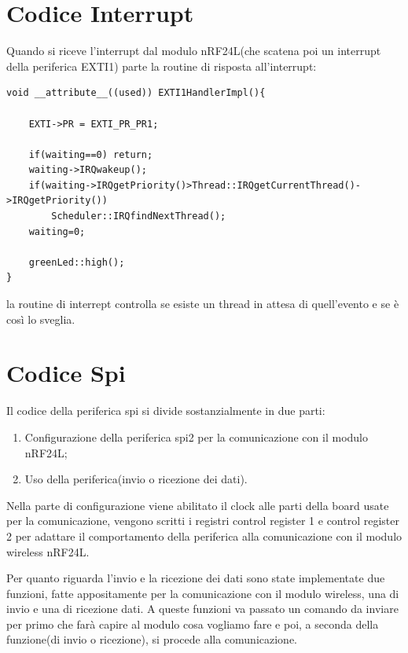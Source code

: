 \section{Codice Interrupt}
Quando si riceve l'interrupt dal modulo nRF24L(che scatena poi un interrupt della periferica EXTI1) parte la routine di risposta all'interrupt:
\begin{verbatim}
void __attribute__((used)) EXTI1HandlerImpl(){
    
    EXTI->PR = EXTI_PR_PR1;   
    
    if(waiting==0) return;
    waiting->IRQwakeup();
    if(waiting->IRQgetPriority()>Thread::IRQgetCurrentThread()->IRQgetPriority()) 
    	Scheduler::IRQfindNextThread();
    waiting=0;
     
    greenLed::high();
}
\end{verbatim}
la routine di interrept controlla se esiste un thread in attesa di quell'evento e se è così lo sveglia.

\section{Codice Spi}
Il codice della periferica spi si divide sostanzialmente in due parti:
\begin{enumerate}
	\item Configurazione della periferica spi2 per la comunicazione con il modulo nRF24L;
	\item Uso della periferica(invio o ricezione dei dati).
\end{enumerate}
Nella parte di configurazione viene abilitato il clock alle parti della board usate per la comunicazione, vengono scritti i registri control register 1 e control register 2 per adattare il comportamento della periferica alla comunicazione con il modulo wireless nRF24L.\par 
Per quanto riguarda l'invio e la ricezione dei dati sono state implementate due funzioni, fatte appositamente per la comunicazione con il modulo wireless, una di invio e una di ricezione dati.
A queste funzioni va passato un comando da inviare per primo che farà capire al modulo cosa vogliamo fare e poi, a seconda della funzione(di invio o ricezione), si procede alla comunicazione.


